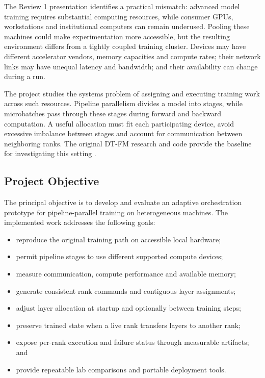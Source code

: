 The Review 1 presentation identifies a practical mismatch: advanced model training requires substantial computing resources, while consumer GPUs, workstations and institutional computers can remain underused. Pooling these machines could make experimentation more accessible, but the resulting environment differs from a tightly coupled training cluster. Devices may have different accelerator vendors, memory capacities and compute rates; their network links may have unequal latency and bandwidth; and their availability can change during a run.

The project studies the systems problem of assigning and executing training work across such resources. Pipeline parallelism divides a model into stages, while microbatches pass through these stages during forward and backward computation. A useful allocation must fit each participating device, avoid excessive imbalance between stages and account for communication between neighboring ranks. The original DT-FM research and code provide the baseline for investigating this setting \cite{dtfm}.

\subsection{Project Objective}

The principal objective is to develop and evaluate an adaptive orchestration prototype for pipeline-parallel training on heterogeneous machines. The implemented work addresses the following goals:
\begin{itemize}[leftmargin=1.2cm,itemsep=3pt]
  \item reproduce the original training path on accessible local hardware;
  \item permit pipeline stages to use different supported compute devices;
  \item measure communication, compute performance and available memory;
  \item generate consistent rank commands and contiguous layer assignments;
  \item adjust layer allocation at startup and optionally between training steps;
  \item preserve trained state when a live rank transfers layers to another rank;
  \item expose per-rank execution and failure status through measurable artifacts; and
  \item provide repeatable lab comparisons and portable deployment tools.
\end{itemize}

